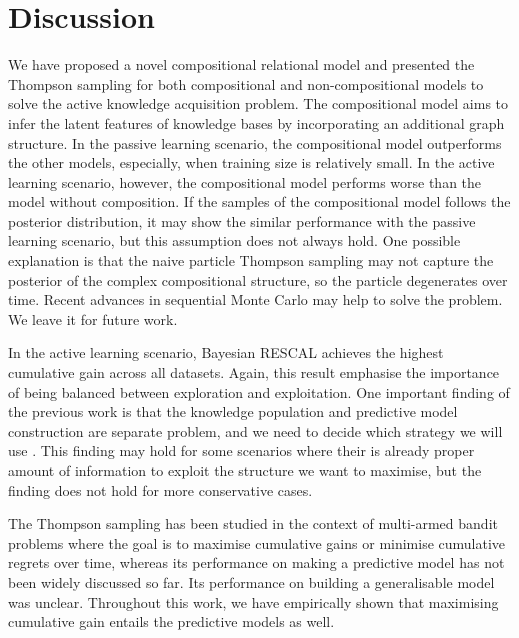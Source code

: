 \section{Discussion}
We have proposed a novel compositional relational model and presented the
Thompson sampling for both compositional and non-compositional models to solve the active knowledge acquisition 
problem. The compositional model aims to infer the latent features of knowledge 
bases by incorporating an additional graph structure. In the passive 
learning scenario, the compositional model outperforms the other models, 
especially, when training size is relatively small. In the active learning 
scenario, however, the compositional model performs worse than the model without 
composition. If the samples of the compositional model follows the posterior 
distribution, it may show the similar performance with the passive learning 
scenario, but this assumption does not always hold. One possible explanation is 
that the naive particle Thompson sampling may not capture the posterior of the 
complex compositional structure, so the particle degenerates over time. Recent
 advances in sequential Monte Carlo may help to solve the problem\cite{gu2015neural,naesseth2014sequential,lindsten2014divide}. 
We leave it  for future work.
 
In the active learning scenario, Bayesian RESCAL achieves the highest 
cumulative gain across all datasets. Again, this result emphasise the 
importance of being balanced between exploration and exploitation. One 
important finding of the previous work is that the knowledge population 
and predictive model construction are separate problem, and we need to 
decide which strategy we will use \cite{kajino2015active}. This finding
may hold for some scenarios where their is already proper amount of 
information to exploit the structure we want to maximise, but the finding 
does not hold for more conservative cases.

The Thompson sampling has been studied in the context of multi-armed bandit 
problems where the goal is to maximise cumulative gains or minimise cumulative 
regrets over time, whereas its performance on making a predictive model has not 
been widely discussed so far. Its performance on building a generalisable model 
was unclear. Throughout this work, we have empirically shown that maximising 
cumulative gain entails the predictive models as well.

